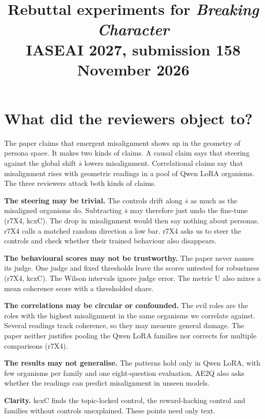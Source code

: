 \documentclass[10pt]{article}
\title{\vspace{-1.6em}Rebuttal experiments for \emph{Breaking Character}\\\large IASEAI 2027, submission 158 \quad 13 November 2026}
\date{}
\author{}
\newcommand{\sbar}{\bar{s}}
\begin{document}
\maketitle
\vspace{-3.2em}

\section{What did the reviewers object to?}

The paper claims that emergent misalignment shows up in the geometry of persona space.
It makes two kinds of claims.
A causal claim says that steering against the global shift $\sbar$ lowers misalignment.
Correlational claims say that misalignment rises with geometric readings in a pool of Qwen LoRA organisms.
The three reviewers attack both kinds of claims.

\textbf{The steering may be trivial.}
The controls drift along $\sbar$ as much as the misaligned organisms do.
Subtracting $\sbar$ may therefore just undo the fine-tune (r7X4, kcxC).
The drop in misalignment would then say nothing about personas.
r7X4 calls a matched random direction a low bar.
r7X4 asks us to steer the controls and check whether their trained behaviour also disappears.

\textbf{The behavioural scores may not be trustworthy.}
The paper never names its judge.
One judge and fixed thresholds leave the scores untested for robustness (r7X4, kcxC).
The Wilson intervals ignore judge error.
The metric U also mixes a mean coherence score with a thresholded share.

\textbf{The correlations may be circular or confounded.}
The evil roles are the roles with the highest misalignment in the same organisms we correlate against.
Several readings track coherence, so they may measure general damage.
The paper neither justifies pooling the Qwen LoRA families nor corrects for multiple comparisons (r7X4).

\textbf{The results may not generalise.}
The patterns hold only in Qwen LoRA, with few organisms per family and one eight-question evaluation.
AE2Q also asks whether the readings can predict misalignment in unseen models.

\textbf{Clarity.}
kcxC finds the topic-locked control, the reward-hacking control and families without controls unexplained.
These points need only text.
\end{document}
